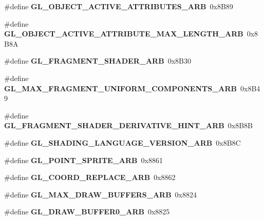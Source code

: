 \begin{DoxyCompactItemize}
\item 
\#define {\bfseries G\+L\+\_\+\+O\+B\+J\+E\+C\+T\+\_\+\+A\+C\+T\+I\+V\+E\+\_\+\+A\+T\+T\+R\+I\+B\+U\+T\+E\+S\+\_\+\+A\+R\+B}~0x8\+B89\label{_s_d_l__opengl_8h_a2a5a01258b0bb907aa9ff7341a69a3cd}

\item 
\#define {\bfseries G\+L\+\_\+\+O\+B\+J\+E\+C\+T\+\_\+\+A\+C\+T\+I\+V\+E\+\_\+\+A\+T\+T\+R\+I\+B\+U\+T\+E\+\_\+\+M\+A\+X\+\_\+\+L\+E\+N\+G\+T\+H\+\_\+\+A\+R\+B}~0x8\+B8\+A\label{_s_d_l__opengl_8h_a50f55f0914b850552d894ca5d684009a}

\item 
\#define {\bfseries G\+L\+\_\+\+F\+R\+A\+G\+M\+E\+N\+T\+\_\+\+S\+H\+A\+D\+E\+R\+\_\+\+A\+R\+B}~0x8\+B30\label{_s_d_l__opengl_8h_a5cc824276a0a610a920ab9e3a0bed3e3}

\item 
\#define {\bfseries G\+L\+\_\+\+M\+A\+X\+\_\+\+F\+R\+A\+G\+M\+E\+N\+T\+\_\+\+U\+N\+I\+F\+O\+R\+M\+\_\+\+C\+O\+M\+P\+O\+N\+E\+N\+T\+S\+\_\+\+A\+R\+B}~0x8\+B49\label{_s_d_l__opengl_8h_aaf52509949799afbaee793e9678f9e80}

\item 
\#define {\bfseries G\+L\+\_\+\+F\+R\+A\+G\+M\+E\+N\+T\+\_\+\+S\+H\+A\+D\+E\+R\+\_\+\+D\+E\+R\+I\+V\+A\+T\+I\+V\+E\+\_\+\+H\+I\+N\+T\+\_\+\+A\+R\+B}~0x8\+B8\+B\label{_s_d_l__opengl_8h_af8bb3a5a8535bdb7921c17cdcaab89fa}

\item 
\#define {\bfseries G\+L\+\_\+\+S\+H\+A\+D\+I\+N\+G\+\_\+\+L\+A\+N\+G\+U\+A\+G\+E\+\_\+\+V\+E\+R\+S\+I\+O\+N\+\_\+\+A\+R\+B}~0x8\+B8\+C\label{_s_d_l__opengl_8h_abb4476a6c23e8fc45eefd74b6576b49f}

\item 
\#define {\bfseries G\+L\+\_\+\+P\+O\+I\+N\+T\+\_\+\+S\+P\+R\+I\+T\+E\+\_\+\+A\+R\+B}~0x8861\label{_s_d_l__opengl_8h_a08d2c10e808cb35e1eb1f067321a0a00}

\item 
\#define {\bfseries G\+L\+\_\+\+C\+O\+O\+R\+D\+\_\+\+R\+E\+P\+L\+A\+C\+E\+\_\+\+A\+R\+B}~0x8862\label{_s_d_l__opengl_8h_acb7631ab9790175dd5256ba6fb7b0a71}

\item 
\#define {\bfseries G\+L\+\_\+\+M\+A\+X\+\_\+\+D\+R\+A\+W\+\_\+\+B\+U\+F\+F\+E\+R\+S\+\_\+\+A\+R\+B}~0x8824\label{_s_d_l__opengl_8h_ae31358785fa6bf90a9d45e9b10bc4f23}

\item 
\#define {\bfseries G\+L\+\_\+\+D\+R\+A\+W\+\_\+\+B\+U\+F\+F\+E\+R0\+\_\+\+A\+R\+B}~0x8825\label{_s_d_l__opengl_8h_a5fa6b22241789664662336f9c80f111e}


\end{DoxyCompactItemize}
